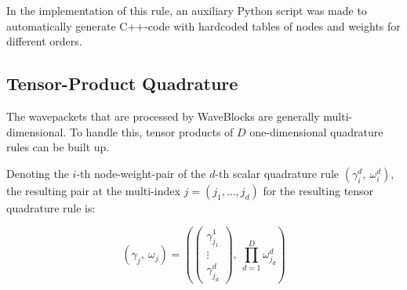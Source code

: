 In the implementation of this rule, an auxiliary Python script was made to
automatically generate C++-code with hardcoded tables of nodes and weights for
different orders.


\subsection{Tensor-Product Quadrature}

The wavepackets that are processed by WaveBlocks are generally multi-dimensional.
To handle this, tensor products of $D$ one-dimensional quadrature rules can be
built up.

Denoting the $i$-th node-weight-pair of the $d$-th scalar quadrature rule
$(\gamma_i^d,\ \omega_i^d)$, the resulting pair at the multi-index $j = (j_1,
\ldots, j_d)$ for the resulting tensor quadrature rule is:

\begin{equation}
  (\gamma_j,\ \omega_j) = \left(
    \begin{pmatrix} \gamma_{j_1}^1 \\ \vdots \\ \gamma_{j_d}^d \end{pmatrix},
    \ \prod_{d=1}^D \omega_{j_d}^d
  \right)
\end{equation}

